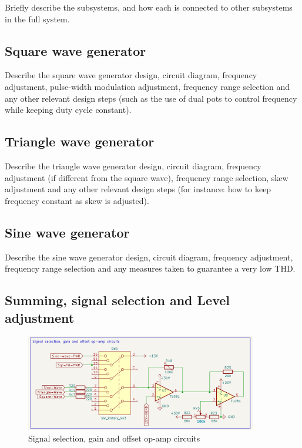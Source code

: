 \documentclass[11pt,a4paper]{article}
\begin{document}
Briefly describe the subsystems, and how each is connected to other subsystems in the full system.

\subsection{Square wave generator}

Describe the square wave generator design, circuit diagram, frequency adjustment, pulse-width modulation adjustment, frequency range selection and any other relevant design steps (such as the use of dual pots to control frequency while keeping duty cycle constant).

\subsection{Triangle wave generator}

Describe the triangle wave generator design, circuit diagram, frequency adjustment (if different from the square wave), frequency range selection, skew adjustment and any other relevant design steps (for instance: how to keep frequency constant as skew is adjusted).

\subsection{Sine wave generator}

Describe the sine wave generator design, circuit diagram, frequency adjustment, frequency range selection and any measures taken to guarantee a very low THD.

\subsection{Summing, signal selection and Level adjustment}

\begin{figure}[H]
	\begin{center}
		\includegraphics[width=0.9\textwidth]{figures/hardware/schematics/signal-gain-offset-op-amp-circuits.png}
		\caption{Signal selection, gain and offset op-amp circuits}
		\label{fig:Signal selection, gain and offset op-amp circuits}
	\end{center}
\end{figure}
\end{document}
